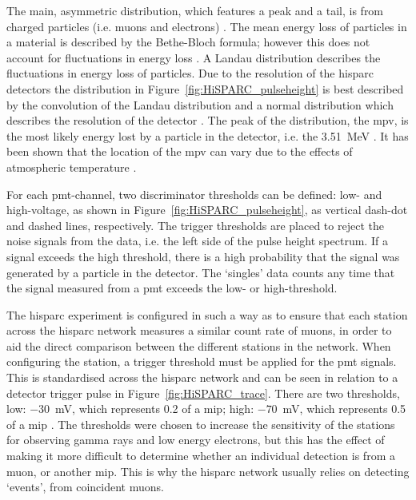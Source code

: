 The main, asymmetric distribution, which features a peak and a tail, is from charged particles (i.e. muons and electrons) \citep{van_dam_hisparc_2020}. The mean energy loss of particles in a material is described by the Bethe-Bloch formula; however this does not account for fluctuations in energy loss \citep{fokkema_hisparc_2012}. A Landau distribution describes the fluctuations in energy loss of particles. Due to the resolution of the \gls{hisparc} detectors the distribution in Figure~\ref{fig:HiSPARC_pulseheight} is best described by the convolution of the Landau distribution and a normal distribution which describes the resolution of the detector \citep{fokkema_hisparc_2012}. The peak of the distribution, the \gls{mpv}, is the most likely energy lost by a particle in the detector, i.e. the 3.51~MeV \citep{van_dam_hisparc_2020}. It has been shown that the location of the \gls{mpv} can vary due to the effects of atmospheric temperature \citep{bartels_hisparc_2012, van_dam_hisparc_2020}.

For each \gls{pmt}-channel, two discriminator thresholds can be defined: low- and high-voltage, as shown in Figure~\ref{fig:HiSPARC_pulseheight}, as vertical dash-dot and dashed lines, respectively.  The trigger thresholds are placed to reject the noise signals from the data, i.e. the left side of the pulse height spectrum. If a signal exceeds the high threshold, there is a high probability that the signal was generated by a particle in the detector. The `singles' data counts any time that the signal measured from a \gls{pmt} exceeds the low- or high-threshold.

The \gls{hisparc} experiment is configured in such a way as to ensure that each station across the \gls{hisparc} network measures a similar count rate of muons, in order to aid the direct comparison between the different stations in the network. When configuring the station, a trigger threshold must be applied for the \gls{pmt} signals. This is standardised across the \gls{hisparc} network and can be seen in relation to a detector trigger pulse in Figure~\ref{fig:HiSPARC_trace}. There are two thresholds, low: $-30$~mV, which represents 0.2 of a \gls{mip}; high: $-70$~mV, which represents 0.5 of a \gls{mip} \citep{fokkema_hisparc_2012, van_dam_hisparc_2020}. The thresholds were chosen to increase the sensitivity of the stations for observing gamma rays and low energy electrons, but this has the effect of making it more difficult to determine whether an individual detection is from a muon, or another \gls{mip}. This is why the \gls{hisparc} network usually relies on detecting `events', from coincident muons.

